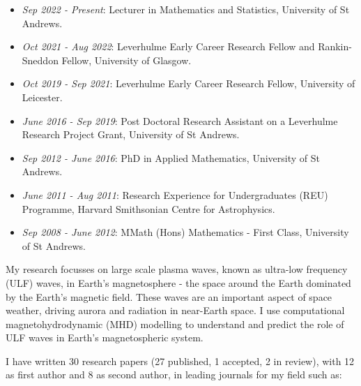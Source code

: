 \documentclass[11pt,a4paper]{article} %
\begin{document}
\begin{itemize}
	\item \textit{Sep 2022 - Present}: Lecturer in Mathematics and Statistics, University of St Andrews.
	\vspace{-0.25cm}
	\item \textit{Oct 2021 - Aug 2022}: Leverhulme Early Career Research Fellow and Rankin-Sneddon Fellow, University of Glasgow. 
	\vspace{-0.25cm}
	\item \textit{Oct 2019 - Sep 2021}: Leverhulme Early Career Research Fellow, University of Leicester.
	\vspace{-0.25cm}
	\item \textit{June 2016 - Sep 2019}: Post Doctoral Research Assistant on a Leverhulme Research Project Grant, University of St Andrews.
	\vspace{-0.25cm}
	\item \textit{Sep 2012 - June 2016}: PhD in Applied Mathematics, University of St Andrews. 
	\vspace{-0.25cm}
	\item \textit{June 2011 - Aug 2011}: Research Experience for Undergraduates (REU) Programme, Harvard Smithsonian Centre for Astrophysics.
	\vspace{-0.25cm}
	\item \textit{Sep 2008 - June 2012}: MMath (Hons) Mathematics - First Class, University of St Andrews.
\end{itemize}

\spacedhrule{0.5em}{-0.4em} %


My research focusses on large scale plasma waves, known as ultra-low frequency (ULF) waves, in Earth's magnetosphere - the space around the Earth dominated by the Earth's magnetic field. These waves are an important aspect of space weather, driving aurora and radiation in near-Earth space. I use computational magnetohydrodynamic (MHD) modelling to understand and predict the role of ULF waves in Earth's magnetospheric system.

\vspace{0.1cm}
\noindent I have written 30 research papers (27 published, 1 accepted, 2 in review), with 12 as first author and 8 as second author, in leading journals for my field such as:
\end{document}

